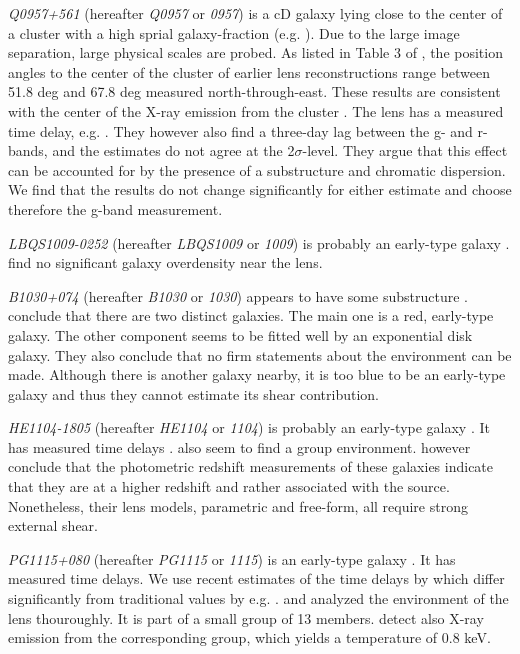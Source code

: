 \documentclass[10pt]{article}
\begin{document}
\textit{Q0957+561} (hereafter \textit{Q0957} or \textit{0957}) is a cD galaxy lying close to the center of a cluster with a high sprial galaxy-fraction (e.g. \cite{1992MNRAS.254P..27G,1994A&A...291..411A,1998ApJ...504..661C}). Due to the large image separation, large physical scales are probed. As listed in Table 3 of \cite{2000ApJ...542...74K}, the position angles to the center of the cluster of earlier lens reconstructions range between 51.8 deg and 67.8 deg measured north-through-east. These results are consistent with the center of the X-ray emission from the cluster \citep{1998ApJ...504..661C}. The lens has a measured time delay, e.g. \citep{2012A&A...540A.132S}. They however also find a three-day lag between the g- and r-bands, and the estimates do not agree at the 2$\sigma$-level. They argue that this effect can be accounted for by the presence of a substructure and chromatic dispersion. We find that the results do not change significantly for either estimate and choose therefore the g-band measurement.

\textit{LBQS1009-0252} (hereafter \textit{LBQS1009} or \textit{1009}) is probably an early-type galaxy \citep{2000ApJ...536..584L}. \cite{2004A&A...428..741F} find no significant galaxy overdensity near the lens.

\textit{B1030+074} (hereafter \textit{B1030} or \textit{1030}) appears to have some substructure \citep{1998MNRAS.300..649X}. \cite{2000ApJ...536..584L} conclude that there are two distinct galaxies. The main one is a red, early-type galaxy. The other component seems to be fitted well by an exponential disk galaxy. They also conclude that no firm statements about the environment can be made. Although there is another galaxy nearby, it is too blue to be an early-type galaxy and thus they cannot estimate its shear contribution.

\textit{HE1104-1805} (hereafter \textit{HE1104} or \textit{1104}) is probably an early-type galaxy \citep{2000ApJ...536..584L,2000A&A...360..853C}. It has measured time delays \citep{2008ApJ...676...80M}. \cite{2000ApJ...536..584L} also seem to find a group environment. \cite{2004A&A...428..741F} however conclude that the photometric redshift measurements of these galaxies indicate that they are at a higher redshift and rather associated with the source. Nonetheless, their lens models, parametric and free-form, all require strong external shear.

\textit{PG1115+080} (hereafter \textit{PG1115} or \textit{1115}) is an early-type galaxy \citep{2005ApJ...626...51Y}. It has measured time delays. We use recent estimates of the time delays by \cite{2010MNRAS.406.2764T} which differ significantly from traditional values by e.g. \cite{1997ApJ...489...21B}. \cite{2006ApJ...641..169M} and \cite{2011ApJ...726...84W} analyzed the environment of the lens thouroughly. It is part of a small group of 13 members. \cite{2004ApJ...610..686G} detect also X-ray emission from the corresponding group, which yields a temperature of 0.8 keV.
\end{document}
